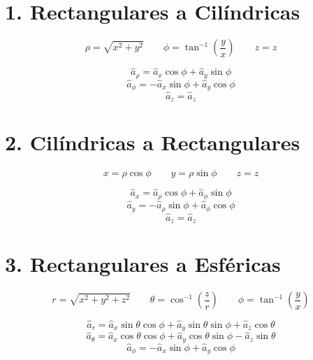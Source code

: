 \documentclass[11pt]{article}
\begin{document}
\begin{multicols}{2}
\section{1. Rectangulares a Cilíndricas}
\begin{equation}
\rho = \sqrt{x^2 + y^2} \qquad 
\phi = \tan^{-1}\left( \frac{y}{x} \right) \qquad 
z = z
\end{equation}


\begin{equation}
    \hat{a}_\rho = \hat{a}_x \cos \phi + \hat{a}_y \sin \phi
\end{equation}
\begin{equation}
    \hat{a}_\phi = -\hat{a}_x \sin \phi + \hat{a}_y \cos \phi
\end{equation}
\begin{equation}
    \hat{a}_z = \hat{a}_z
\end{equation}

\section{2. Cilíndricas a Rectangulares}
\begin{equation}
x = \rho \cos \phi \qquad 
y = \rho \sin \phi \qquad 
z = z
\end{equation}


\begin{equation}
    \hat{a}_x = \hat{a}_\rho \cos \phi + \hat{a}_\phi \sin \phi
\end{equation}
\begin{equation}
    \hat{a}_y = -\hat{a}_\rho \sin \phi + \hat{a}_\phi \cos \phi
\end{equation}
\begin{equation}
    \hat{a}_z = \hat{a}_z
\end{equation}

\section{3. Rectangulares a Esféricas}
\begin{equation}
r = \sqrt{x^2 + y^2 + z^2} \qquad 
\theta = \cos^{-1} \left( \frac{z}{r} \right) \qquad 
\phi = \tan^{-1} \left( \frac{y}{x} \right)
\end{equation}


\begin{equation}
    \hat{a}_r = \hat{a}_x \sin \theta \cos \phi + \hat{a}_y \sin \theta \sin \phi + \hat{a}_z \cos \theta
\end{equation}
\begin{equation}
    \hat{a}_\theta = \hat{a}_x \cos \theta \cos \phi + \hat{a}_y \cos \theta \sin \phi - \hat{a}_z \sin \theta
\end{equation}
\begin{equation}
    \hat{a}_\phi = -\hat{a}_x \sin \phi + \hat{a}_y \cos \phi
\end{equation}


\end{multicols}
\end{document}
